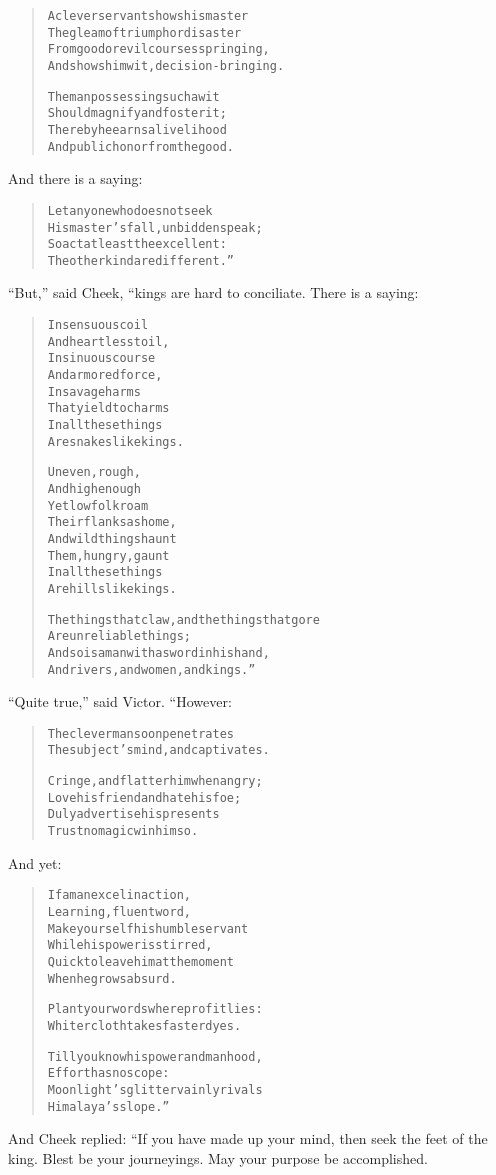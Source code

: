 \documentclass[article, twoside, 14pt]{memoir}
\renewenvironment{verbatim}{%
\begin{quote}%
\vskip -10pt%
\begin{alltt}\normalfont\large}{\end{alltt}%
\end{quote}%
\vskip -10pt
} %
\begin{document}
\begin{verbatim}
A clever servant shows his master
The gleam of triumph or disaster
From good or evil courses springing,
And shows him wit, decision-bringing.

The man possessing such a wit
Should magnify and foster it;
Thereby he earns a livelihood
And public honor from the good.
\end{verbatim}
And there is a saying:

\begin{verbatim}
Let anyone who does not seek
His master's fall, unbidden speak;
So act at least the excellent:
The other kind are different.”
\end{verbatim}
``But,'' said Cheek, “kings are hard to conciliate. There is a
saying:

\begin{verbatim}
In sensuous coil
And heartless toil,
In sinuous course
And armored force,
In savage harms
That yield to charms{\textemdash}
In all these things
Are snakes like kings.

Uneven, rough,
And high enough{\textemdash}
Yet low folk roam
Their flanks as home,
And wild things haunt
Them, hungry, gaunt{\textemdash}
In all these things
Are hills like kings.

The things that claw, and the things that gore
    Are unreliable things;
And so is a man with a sword in his hand,
    And rivers, and women, and kings.”
\end{verbatim}
``Quite true,'' said Victor. “However:

\begin{verbatim}
The clever man soon penetrates
The subject's mind, and captivates.

Cringe, and flatter him when angry;
    Love his friend and hate his foe;
Duly advertise his presents{\textemdash}
    Trust no magic{\textemdash}win him so.
\end{verbatim}
And yet:

\begin{verbatim}
If a man excel in action,
    Learning, fluent word,
Make yourself his humble servant
    While his power is stirred,
Quick to leave him at the moment
    When he grows absurd.

Plant your words where profit lies:
Whiter cloth takes faster dyes.

Till you know his power and manhood,
    Effort has no scope:
Moonlight's glitter vainly rivals
    Himalaya's slope.”
\end{verbatim}
And Cheek replied: “If you have made up your mind, then seek the
feet of the king. Blest be your journeyings. May your purpose be
accomplished.
\end{document}
